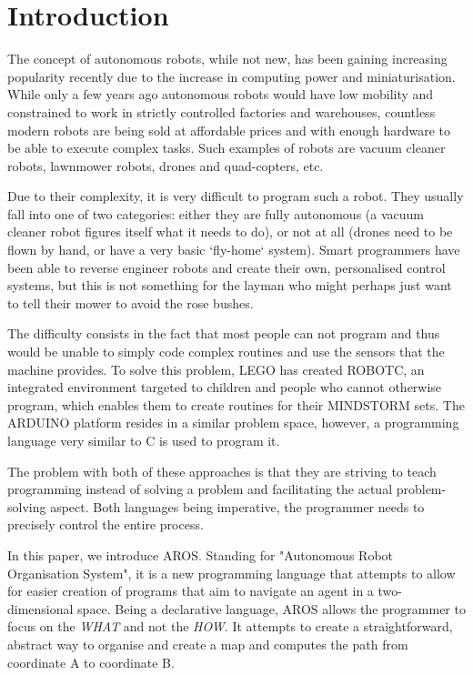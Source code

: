 \chapter{Introduction}
\label{chap:Intro}

\par
The concept of autonomous robots, while not new, has been gaining increasing popularity recently due to the increase in computing power and miniaturisation. While only a few years ago autonomous robots would have low mobility and constrained to work in strictly controlled factories and warehouses, countless modern robots are being sold at affordable prices and with enough hardware to be able to execute complex tasks. Such examples of robots are vacuum cleaner robots, lawnmower robots, drones and quad-copters, etc.
\par
Due to their complexity, it is very difficult to program such a robot. They usually fall into one of two categories: either they are fully autonomous (a vacuum cleaner robot figures itself what it needs to do), or not at all (drones need to be flown by hand, or have a very basic `fly-home` system). Smart programmers have been able to reverse engineer robots and create their own, personalised control systems, but this is not something for the layman who might perhaps just want to tell their mower to avoid the rose bushes.
\par
The difficulty consists in the fact that most people can not program and thus would be unable to simply code complex routines and use the sensors that the machine provides. To solve this problem, LEGO has created ROBOTC\cite{lego-robotc}, an integrated environment targeted to children and people who cannot otherwise program, which enables them to create routines for their MINDSTORM sets. The ARDUINO\cite{arduino} platform resides in a similar problem space, however, a programming language very similar to C is used to program it.
\par
The problem with both of these approaches is that they are striving to teach programming instead of solving a problem and facilitating the actual problem-solving aspect. Both languages being imperative, the programmer needs to precisely control the entire process.

\par
In this paper, we introduce AROS. Standing for "Autonomous Robot Organisation System", it is a new programming language that attempts to allow for easier creation of programs that aim to navigate an agent in a two-dimensional space. Being a declarative language, AROS allows the programmer to focus on the \textit{WHAT} and not the \textit{HOW}. It attempts to create a straightforward, abstract way to organise and create a map and computes the path from coordinate A to coordinate B.

